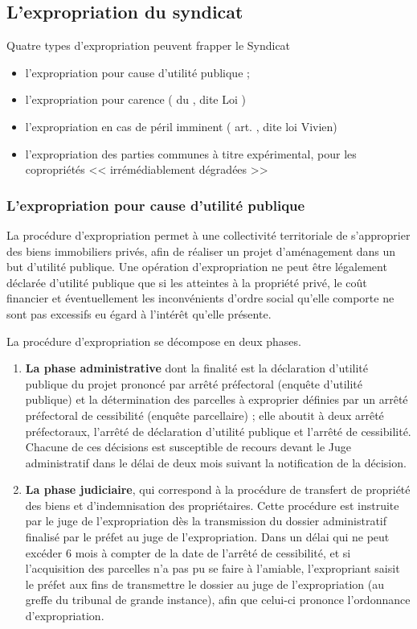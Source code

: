 	\subsection{L’expropriation du syndicat}
	
		Quatre types d’expropriation peuvent frapper le Syndicat
		\begin{itemize}
			\item  l'expropriation pour cause d’utilité publique ;
			\item  l'expropriation pour carence ( du \CCH, dite Loi )
			\item  l’expropriation en cas de péril imminent ( art. , dite loi Vivien)
			\item  l’expropriation des parties communes à titre expérimental, pour les copropriétés
			<< irrémédiablement dégradées >>
		\end{itemize}
		
		\subsubsection{L'expropriation pour cause d’utilité publique}
		
		La procédure d'expropriation permet à une collectivité territoriale de s'approprier des biens immobiliers
		privés, afin de réaliser un projet d'aménagement dans un but d'utilité publique. Une opération
		d'expropriation ne peut être légalement déclarée d'utilité publique que si les atteintes à la propriété privé,
		le coût financier et éventuellement les inconvénients d'ordre social qu'elle comporte ne sont pas excessifs
		eu égard à l'intérêt qu'elle présente.
		
		La procédure d'expropriation se décompose en deux phases.
		\begin{enumerate}
			\item \textbf{La phase administrative} dont la finalité est la déclaration d'utilité publique du projet prononcé par arrêté
			préfectoral (enquête d'utilité publique) et la détermination des parcelles à exproprier définies par un
			arrêté préfectoral de cessibilité (enquête parcellaire) ; elle aboutit à deux arrêté préfectoraux, l’arrêté de
			déclaration d’utilité publique et l’arrêté de cessibilité. Chacune de ces décisions est susceptible de recours
			devant le Juge administratif dans le délai de deux mois suivant la notification de la décision.
			
			\item \textbf{La phase judiciaire}, qui correspond à la procédure de transfert de propriété des biens et d'indemnisation
			des propriétaires. Cette procédure est instruite par le juge de l'expropriation dès la transmission du dossier
			administratif finalisé par le préfet au juge de l'expropriation. Dans un délai qui ne peut excéder 6 mois à
			compter de la date de l'arrêté de cessibilité, et si l'acquisition des parcelles n'a pas pu se faire à l'amiable,
			l'expropriant saisit le préfet aux fins de transmettre le dossier au juge de l'expropriation (au greffe du
			tribunal de grande instance), afin que celui-ci prononce l'ordonnance d'expropriation.
		\end{enumerate}
		
